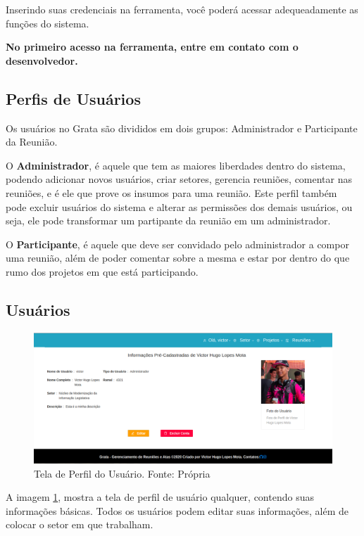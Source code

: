 Inserindo suas credenciais na ferramenta, você poderá acessar adequeadamente as funções do sistema.

\textbf{No primeiro acesso na ferramenta, entre em contato com o desenvolvedor.}

\subsection{Perfis de Usuários}

Os usuários no Grata são divididos em dois grupos: Administrador e Participante da Reunião.

O \textbf{Administrador}, é aquele que tem as maiores liberdades dentro do sistema, podendo adicionar novos usuários, criar setores, gerencia reuniões, comentar nas reuniões, e é ele que prove os insumos para uma reunião. Este perfil também pode excluir usuários do sistema e alterar as permissões dos demais usuários, ou seja, ele pode transformar um partipante da reunião em um administrador.

O \textbf{Participante}, é aquele que deve ser convidado pelo administrador a compor uma reunião, além de poder comentar sobre a mesma e estar por dentro do que rumo dos projetos em que está participando.

\subsection{Usuários}

\begin{figure}[H]
    \centering
    \includegraphics[width=1.0\textwidth]{figuras/tela_perfil.png}
    \caption{Tela de Perfil do Usuário. Fonte: Própria}
    \label{img:tela_perfil_usuario}
\end{figure}

A imagem \ref{img:tela_perfil_usuario}, mostra a tela de perfil de usuário qualquer, contendo suas informações básicas. Todos os usuários podem editar suas informações, além de colocar o setor em que trabalham.

